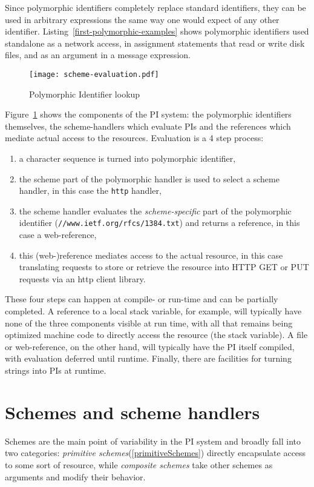 \documentclass[preprint,authoryear]{acm_proc_article-sp}
\begin{document}
Since polymorphic identifiers completely replace standard identifiers, they can be used
in arbitrary expressions the same way one would expect of any other identifier.  
Listing~\ref{first-polymorphic-examples} shows polymorphic identifiers used 
standalone as a network access, in assignment statements that read or write disk files,
and as an argument in a message expression.

\begin{figure}[htbp]
\label{scheme-eval}
\begin{center}
\texttt{[image: scheme-evaluation.pdf]}
\caption{Polymorphic Identifier lookup}
\end{center}
\end{figure}

Figure~\ref{scheme-eval} shows the components of the PI system:  the polymorphic
identifiers themselves, the scheme-handlers which evaluate PIs and the references
which mediate actual access to the resources.  Evaluation is a 4 step process:

\begin{enumerate}
\item a character sequence is turned into  polymorphic identifier,
\item the scheme part of the polymorphic handler is used to select a scheme handler, in this case the {\tt http} handler,
\item the scheme handler evaluates the {\em scheme-specific} part of the polymorphic identifier ({\tt //www.ietf.org/rfcs/1384.txt})
	 and returns a reference, in this case a web-reference,
\item this (web-)reference mediates access to the actual resource, in this case translating requests to store or retrieve the 
	resource into HTTP GET or PUT requests via an http client library.
\end{enumerate}

These four steps can happen at compile- or run-time and can be partially completed.
A reference to a local stack variable, for example, will typically have none of the
three components visible at run time, with all that remains being optimized 
machine code to directly access the resource (the stack variable).
A file or web-reference, on the other hand, will typically have the PI itself
compiled, with evaluation deferred until runtime.  Finally, there are facilities
for turning strings into PIs at runtime.


\section{Schemes and scheme handlers}
\label{schemes}
Schemes are the main point of variability in the PI system
and broadly fall into two categories:   {\em primitive schemes}(\ref{primitiveSchemes})
directly encapsulate access to some sort of resource, while {\em composite schemes} 
take other schemes as arguments and modify their behavior.
\end{document}
